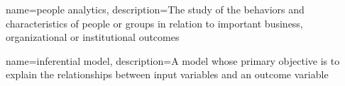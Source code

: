 \usepackage{booktabs}
\usepackage{longtable}
\usepackage{graphicx}
\usepackage{hyperref}
\usepackage[bf,singlelinecheck=off]{caption}
\usepackage[scale=.8]{sourcecodepro}

\usepackage{framed,color}

\renewcommand{\textfraction}{0.05}
\renewcommand{\topfraction}{0.8}
\renewcommand{\bottomfraction}{0.8}
\renewcommand{\floatpagefraction}{0.75}

\renewenvironment{quote}{\begin{VF}}{\end{VF}}
\let\oldhref\href
\renewcommand{\href}[2]{#2\footnote{\url{#1}}}

\makeatletter
\newenvironment{kframe}{%
\medskip{}
\setlength{\fboxsep}{.8em}
 \def\at@end@of@kframe{}%
 \ifinner\ifhmode%
  \def\at@end@of@kframe{\end{minipage}}%
  \begin{minipage}{\columnwidth}%
 \fi\fi%
 \def\FrameCommand##1{\hskip\@totalleftmargin \hskip-\fboxsep
 \colorbox{shadecolor}{##1}\hskip-\fboxsep
     \hskip-\linewidth \hskip-\@totalleftmargin \hskip\columnwidth}%
 \MakeFramed {\advance\hsize-\width
   \@totalleftmargin\z@ \linewidth\hsize
   \@setminipage}}%
 {\par\unskip\endMakeFramed%
 \at@end@of@kframe}
\makeatother

\renewenvironment{Shaded}{\begin{kframe}}{\end{kframe}}

\usepackage{makeidx}
\makeindex


\usepackage{amsthm}
\makeatletter
\def\thm@space@setup{%
  \thm@preskip=8pt plus 2pt minus 4pt
  \thm@postskip=\thm@preskip
}
\makeatother

\usepackage[nonumberlist]{glossaries}
\makenoidxglossaries

{
    name={people analytics},
    description={The study of the behaviors and characteristics of people or groups in relation to important business, organizational or institutional outcomes}
}

{
    name={inferential model},
    description={A model whose primary objective is to explain the relationships between input variables and an outcome variable}
}

